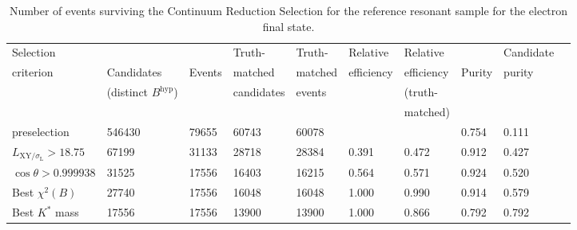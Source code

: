 \begin{table}[!ht] 
    \caption{Number of events surviving the Continuum Reduction Selection for the reference resonant sample for the electron final state.} 
    \centering 
    \hspace*{-0.6cm}
    {\small
    \begin{tabular}{l | l l l l l l l l l } 
    \hline\hline
    Selection &             &        & Truth- & Truth- & Relative & Relative &  &  Candidate\\
    criterion & Candidates  & Events & matched & matched & efficiency & efficiency & Purity & purity\\
              &   (distinct $B^{\mathrm{hyp}}$)          &        & candidates & events &          & (truth- & &\\
              &              &        &   &   &          & matched) & & \\          
    \hline
    preselection& 546430& 79655& 60743& 60078&&& 0.754& 0.111\\
    \hline
    $L_{\mathrm{XY}/\sigma_{\mathrm{L}}} > 18.75$& 67199& 31133& 28718& 28384& 0.391& 0.472& 0.912& 0.427\\
    $\cos \theta> 0.999938$& 31525& 17556& 16403& 16215& 0.564& 0.571& 0.924& 0.520\\
    Best $\chi^{2}(B)$& 27740& 17556& 16048& 16048& 1.000& 0.990& 0.914& 0.579\\
    Best $K^{*}$ mass& 17556& 17556& 13900& 13900& 1.000& 0.866& 0.792& 0.792\\
    \hline\hline
    \end{tabular} 
}
\label{tab:CRS_res}
\end{table}